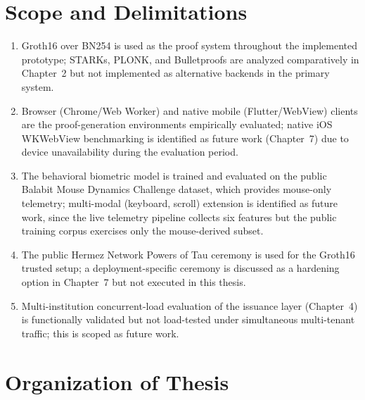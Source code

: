 \documentclass[12pt,a4paper,oneside]{report}
\begin{document}
\section{Scope and Delimitations}

\begin{enumerate}
  \item Groth16 over BN254 is used as the proof system throughout the
        implemented prototype; STARKs, PLONK, and Bulletproofs are analyzed
        comparatively in Chapter~2 but not implemented as alternative
        backends in the primary system.
  \item Browser (Chrome/Web Worker) and native mobile (Flutter/WebView)
        clients are the proof-generation environments empirically evaluated;
        native iOS WKWebView benchmarking is identified as future work
        (Chapter~7) due to device unavailability during the evaluation
        period.
  \item The behavioral biometric model is trained and evaluated on the
        public Balabit Mouse Dynamics Challenge dataset, which provides
        mouse-only telemetry; multi-modal (keyboard, scroll) extension is
        identified as future work, since the live telemetry pipeline
        collects six features but the public training corpus exercises
        only the mouse-derived subset.
  \item The public Hermez Network Powers of Tau ceremony is used for the
        Groth16 trusted setup; a deployment-specific ceremony is discussed
        as a hardening option in Chapter~7 but not executed in this thesis.
  \item Multi-institution concurrent-load evaluation of the issuance layer
        (Chapter~4) is functionally validated but not load-tested under
        simultaneous multi-tenant traffic; this is scoped as future work.
\end{enumerate}

\section{Organization of Thesis}
\end{document}

